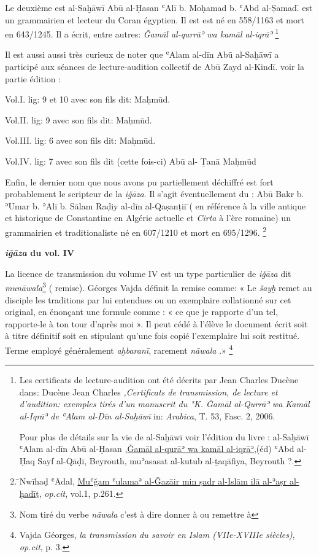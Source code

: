 \documentclass[a4paper,12pt]{report}
\begin{document}
 Le deuxième est al-Saḫāwī Abū al-Ḥasan ʿAlī b. Moḥamad b. ʿAbd al-Ṣamad.̄  est un grammairien et lecteur du Coran égyptien. Il est 
 est né en 558/1163 et mort en 643/1245. Il a écrit, entre autres: \textit{Ǧamāl al-qurrāʾ wa kamāl al-iqrāʾ} \footnote{Les certificats de lecture-audition ont été décrits par Jean Charles Ducène dans: 
Ducène Jean Charles \textit{,Certificats de transmission, de lecture et d'audition: exemples tirés d'un manuscrit du "K.
Ǧamāl al-Qurrāʾ wa Kamāl al-Iqrāʾ de ʿAlam al-Dīn al-Saḫāwī} in: \textit{Arabica},  T. 53, Fasc. 2, 2006.

Pour plus  de détails sur la vie de al-Saḫāwī voir l'édition du livre : al-Saḫāwī ʿAlam al-dīn Abū al-Ḥasan ,\underline{Ǧamāl al-qurāʾ wa kamāl al-iqrāʾ},(éd) ʿAbd al-Ḥaq Sayf al-Qāḍī, Beyrouth, muʾasasat al-kutub al-ṯaqāfiya, Beyrouth ?.}
 
Il est aussi aussi très curieux de noter que ʿAlam al-dīn Abū al-Saḫāwī a participé aux  séances de lecture-audition collectif  de Ab\=u Zayd al-Kind\=i. voir la partie édition : 

 Vol.I. lig: 9 et 10 avec son fils dit: Maḥmūd.

 Vol.II. lig: 9  avec son fils dit: Maḥmūd.

 Vol.III. lig: 6 avec son fils dit: Maḥmūd.

 Vol.IV. lig: 7 avec son fils dit (cette fois-ci) Abū al- Ṯanā Maḥmūd 

Enfin, le dernier nom que nous avons pu partiellement déchiffré est fort probablement  le scripteur de la \textit{iǧāza}. Il s'agit éventuellement du : 
Abū Bakr b. ʾUmar b. ʾAlī b. Sālam Raḍiy al-dīn al-Qaṣanṭii
̄( en référence à la ville antique et historique de Constantine en Algérie actuelle et \textit{Cirta} à l'ère romaine)  
un grammairien et traditionaliste   né en  607/1210 et mort en 695/1296. \footnote{̄Nwīhaḍ ʿĀdal, \underline {Muʿǧam ʿulamaʾ al-Ǧazāir min ṣadr al-Islām ilā al-ʾaṣr al-ḥadī}ṯ, \textit{op.cit}, vol.1, p.261.}  
\begin{center}
    

\textbf{\textit{iǧāza} du vol. IV}
\end{center}
 La licence de transmission du volume IV est un type particulier de \textit{iǧāza} dit \textit{munāwala}\footnote{Nom tiré du verbe  \textit{nāwala} c'est à dire donner à ou remettre à } ( remise). Géorges Vajda définit la remise comme: « Le\textit{ šayḫ} remet au disciple les traditions par lui entendues ou un exemplaire collationné sur cet original, en énonçant une formule comme : « ce que je rapporte d'un tel, rapporte-le à ton tour d'après moi ». Il peut cédé à l'élève le document écrit soit à titre définitif soit en stipulant qu'une fois copié l'exemplaire lui soit restitué. Terme employé généralement \textit{aḫbaranī}, rarement \textit{nāwala} .» \footnote{Vajda Géorges, \textit{la transmission du savoir en Islam (VIIe-XVIIIe siècles)}, \textit{op.cit}, p. 3.}
\end{document}
